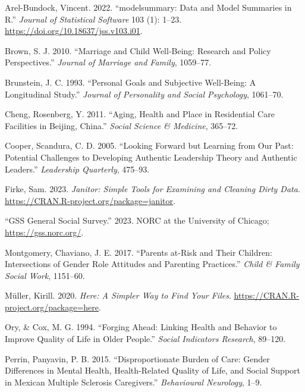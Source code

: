 \documentclass[
  letterpaper,
  DIV=11,
  numbers=noendperiod]{scrartcl}
\newlength{\cslhangindent}
\newlength{\cslentryspacingunit} %
\newenvironment{CSLReferences}[2] %
 {%
  \setlength{\parindent}{0pt}
  \ifodd #1
  \let\oldpar\par
  \def\par{\hangindent=\cslhangindent\oldpar}
  \fi
  \setlength{\parskip}{#2\cslentryspacingunit}
 }%
 {}
\begin{document}
\hypertarget{refs}{}
\begin{CSLReferences}{1}{0}
\leavevmode{}%
Arel-Bundock, Vincent. 2022. {``{modelsummary}: Data and Model Summaries
in {R}.''} \emph{Journal of Statistical Software} 103 (1): 1--23.
\url{https://doi.org/10.18637/jss.v103.i01}.

\leavevmode{}%
Brown, S. J. 2010. {``Marriage and Child Well-Being: Research and Policy
Perspectives.''} \emph{Journal of Marriage and Family}, 1059--77.

\leavevmode{}%
Brunstein, J. C. 1993. {``Personal Goals and Subjective Well-Being: A
Longitudinal Study.''} \emph{Journal of Personality and Social
Psychology}, 1061--70.

\leavevmode{}%
Cheng, Rosenberg, Y. 2011. {``Aging, Health and Place in Residential
Care Facilities in Beijing, China.''} \emph{Social Science \& Medicine},
365--72.

\leavevmode{}%
Cooper, Scandura, C. D. 2005. {``Looking Forward but Learning from Our
Past: Potential Challenges to Developing Authentic Leadership Theory and
Authentic Leaders.''} \emph{Leadership Quarterly}, 475--93.

\leavevmode{}%
Firke, Sam. 2023. \emph{Janitor: Simple Tools for Examining and Cleaning
Dirty Data}. \url{https://CRAN.R-project.org/package=janitor}.

\leavevmode{}%
{``GSS General Social Survey.''} 2023. NORC at the University of
Chicago; \url{https://gss.norc.org/}.

\leavevmode{}%
Montgomery, Chaviano, J. E. 2017. {``Parents at-Risk and Their Children:
Intersections of Gender Role Attitudes and Parenting Practices.''}
\emph{Child \& Family Social Work}, 1151--60.

\leavevmode{}%
Müller, Kirill. 2020. \emph{Here: A Simpler Way to Find Your Files}.
\url{https://CRAN.R-project.org/package=here}.

\leavevmode{}%
Ory, \& Cox, M. G. 1994. {``Forging Ahead: Linking Health and Behavior
to Improve Quality of Life in Older People.''} \emph{Social Indicators
Research}, 89--120.

\leavevmode{}%
Perrin, Panyavin, P. B. 2015. {``Disproportionate Burden of Care: Gender
Differences in Mental Health, Health-Related Quality of Life, and Social
Support in Mexican Multiple Sclerosis Caregivers.''} \emph{Behavioural
Neurology}, 1--9.


\end{CSLReferences}
\end{document}

